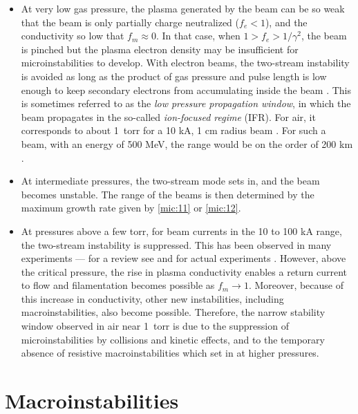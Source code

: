 \documentclass [12pt,a4paper,     ]{report} %
\begin{document}
\begin{itemize}

	\item At very low gas pressure, the plasma generated by the beam can be so weak that the beam is only partially charge neutralized ($f_e<1$), and the conductivity so low that $f_m\approx 0$.  In that case, when $1 > f_e > 1/\gamma^2$, the beam is pinched but the plasma electron density may be insufficient for microinstabilities to develop.  With electron beams, the two-stream instability is avoided as long as the product of gas pressure and pulse length is low enough to keep secondary electrons from accumulating inside the beam \cite{BRIGG1981-}.  This is sometimes referred to as the \emph{low pressure propagation window}, in which the beam propagates in the so-called \emph{ion-focused regime} (IFR).  For air, it corresponds to about 1~torr for a 10 kA, 1 cm radius beam \cite{BEAL-1972-,BRIGG1981-}.  For such a beam, with an energy of 500 MeV, the range would be on the order of 200 km \cite{BRIGG1981-}.

	\item At intermediate pressures, the two-stream mode sets in, and the beam becomes unstable.  The range of the beams is then determined by the maximum growth rate given by \eqref{mic:11} or \eqref{mic:12}.

	\item At pressures above a few torr, for beam currents in the 10 to 100 kA range, the two-stream instability is suppressed.  This has been observed in many experiments --- for a review see \cite{WALLI1975-} and for actual experiments \cite{MOIR-1981-,BRIGG1977-}.  However, above the critical pressure, the rise in plasma conductivity enables a return current to flow and filamentation becomes possible as $f_m \rightarrow 1$.  Moreover, because of this increase in conductivity, other new instabilities, including macroinstabilities, also become possible.  Therefore, the narrow stability window observed in air near 1~torr is due to the suppression of microinstabilities by collisions and kinetic effects, and to the temporary absence of resistive macroinstabilities which set in at higher pressures.

\end{itemize}



\section{Macroinstabilities}
\label{mac:0}
\end{document}
